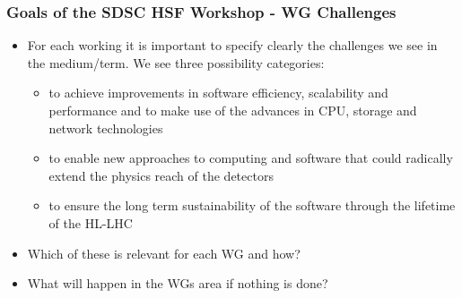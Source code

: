 \begin{frame}
\frametitle{Goals of the SDSC HSF Workshop - WG Challenges}

\begin{itemize}
\item For each working it is important to specify clearly the challenges we see in the medium/term. We see three possibility categories:
   \begin{itemize}
   \item to achieve improvements in software efficiency, scalability and performance and to make use of the advances in CPU, storage and network technologies
   \item to enable new approaches to computing and software that could radically extend the physics reach of the detectors
   \item to ensure the long term sustainability of the software through the lifetime of the HL-LHC
   \end{itemize}
\item Which of these is relevant for each WG and how?
\item What will happen in the WGs area if nothing is done?
\end{itemize}

\end{frame}


